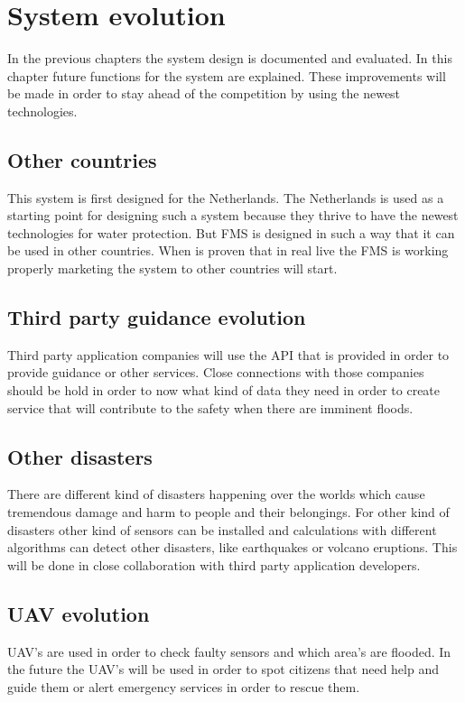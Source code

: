 \chapter{System evolution}

\label{ch:evolution}
In the previous chapters the system design is documented and evaluated. In this chapter future functions for the system are explained. These improvements will be made in order to stay ahead of the competition by using the newest technologies.

\section{Other countries}
This system is first designed for the Netherlands. The Netherlands is used as a starting point for designing such a system because they thrive to have the newest technologies for water protection. But FMS is designed in such a way that it can be used in other countries. When is proven that in real live the FMS is working properly marketing the system to other countries will start.

\section{Third party guidance evolution}
Third party application companies will use the API that is provided in order to provide guidance or other services. Close connections with those companies should be hold in order to now what kind of data they need in order to create service that will contribute to the safety when there are imminent floods. 

\section{Other disasters}
There are different kind of disasters happening over the worlds which cause tremendous damage and harm to people and their belongings. For other kind of disasters other kind of sensors can be installed and calculations with different algorithms can detect other disasters, like earthquakes or volcano eruptions. This will be done in close collaboration with third party application developers.

\section{UAV evolution}
UAV's are used in order to check faulty sensors and which area's are flooded. In the future the UAV's will be used in order to spot citizens that need help and guide them or alert emergency services in order to rescue them. 

